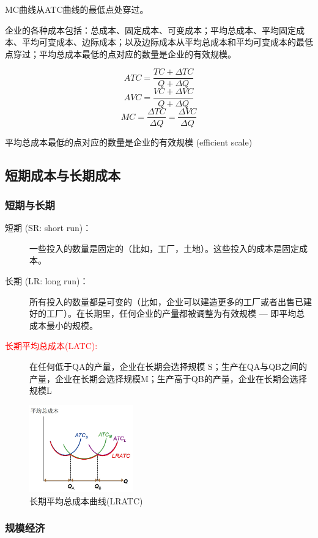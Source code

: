 \documentclass[12pt, a4paper]{article}
\begin{document}
MC曲线从ATC曲线的最低点处穿过。

企业的各种成本包括：总成本、固定成本、可变成本；平均总成本、平均固定成本、平均可变成本、边际成本；以及边际成本从平均总成本和平均可变成本的最低点穿过；平均总成本最低的点对应的数量是企业的有效规模。

\[ ATC = \frac{TC + \Delta TC}{Q + \Delta Q} \]
\[ AVC = \frac{VC + \Delta VC}{Q + \Delta Q} \]
\[ MC = \frac{\Delta TC}{\Delta Q} = \frac{\Delta VC}{\Delta Q} \]

平均总成本最低的点对应的数量是企业的有效规模 (efficient scale)

\subsection{短期成本与长期成本}
\subsubsection{短期与长期}

\begin{description}
  \item[短期 (SR: short run)：] 一些投入的数量是固定的（比如，工厂，土地）。这些投入的成本是固定成本。
  \item[长期 (LR: long run)：] 所有投入的数量都是可变的（比如，企业可以建造更多的工厂或者出售已建好的工厂）。在长期里，任何企业的产量都被调整为有效规模 — 即平均总成本最小的规模。
  \item[\textcolor{red}{长期平均总成本(LATC):}] 在任何低于QA的产量，企业在长期会选择规模 S；生产在QA与QB之间的产量，企业在长期会选择规模M；生产高于QB的产量，企业在长期会选择规模L 
\end{description}


\begin{figure}[H] 
  \centering %
  \includegraphics[width=0.4\textwidth]{长期平均总成本.png} 
  \caption{长期平均总成本曲线(LRATC)} %
\end{figure}

\subsubsection{规模经济}
\end{document}
